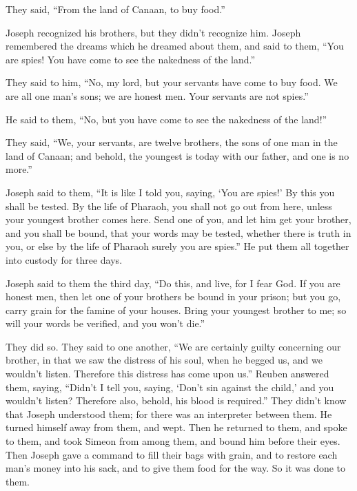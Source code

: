 They said, ``From the land of Canaan, to buy food.''

 Joseph recognized his brothers, but they didn't recognize
him.  Joseph remembered the dreams which he dreamed about
them, and said to them, ``You are spies! You have come to see the
nakedness of the land.''

 They said to him, ``No, my lord, but your servants have
come to buy food.  We are all one man's sons; we are
honest men. Your servants are not spies.''

 He said to them, ``No, but you have come to see the
nakedness of the land!''

 They said, ``We, your servants, are twelve brothers, the
sons of one man in the land of Canaan; and behold, the youngest is today
with our father, and one is no more.''

 Joseph said to them, ``It is like I told you, saying,
`You are spies!'  By this you shall be tested. By the
life of Pharaoh, you shall not go out from here, unless your youngest
brother comes here.  Send one of you, and let him get
your brother, and you shall be bound, that your words may be tested,
whether there is truth in you, or else by the life of Pharaoh surely you
are spies.''  He put them all together into custody for
three days.

 Joseph said to them the third day, ``Do this, and live,
for I fear God.  If you are honest men, then let one of
your brothers be bound in your prison; but you go, carry grain for the
famine of your houses.  Bring your youngest brother to
me; so will your words be verified, and you won't die.''

They did so.  They said to one another, ``We are
certainly guilty concerning our brother, in that we saw the distress of
his soul, when he begged us, and we wouldn't listen. Therefore this
distress has come upon us.''  Reuben answered them,
saying, ``Didn't I tell you, saying, `Don't sin against the child,' and
you wouldn't listen? Therefore also, behold, his blood is required.''
 They didn't know that Joseph understood them; for there
was an interpreter between them.  He turned himself away
from them, and wept. Then he returned to them, and spoke to them, and
took Simeon from among them, and bound him before their eyes.
 Then Joseph gave a command to fill their bags with
grain, and to restore each man's money into his sack, and to give them
food for the way. So it was done to them.

